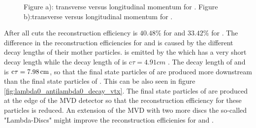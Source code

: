 		\begin{figure}
			
			\caption{\propose Figure a): transverse versus longitudinal momentum for \lam. Figure b):transverse versus longitudinal momentum for \alam.}
			\label{fig:lambda0_pt_vs_pz}
		
		\end{figure}
		After all cuts the reconstruction efficiency is $40.48\%$ for \lam and $33.42\%$ for \alam.
		The difference in the reconstruction efficiencies for \lam and \alam is caused by the different decay lengths of their mother particles.
		\lam is emitted by the \excitedcascade which has a very short decay length while the decay length of \anticascade is 
		c$\tau = 4.91 \unit{cm}$ \cite{PDG}.
		The decay length of \lam and \alam is $\textnormal{c}\tau = 7.98 \, \textnormal{cm}$, so that the final state particles of \alam are produced more downstream 
		than the final state particles of \lam.
		This can be also seen in figure \ref{fig:lambda0_antilambda0_decay_vtx}.
		The final state particles of \alam are produced at the edge of the MVD detector so that the reconstruction efficiency for these particles is reduced.
		An extension of the MVD with two more discs the so-called "Lambda-Discs" might improve the reconstruction efficienies for \lam and \alam.
		

